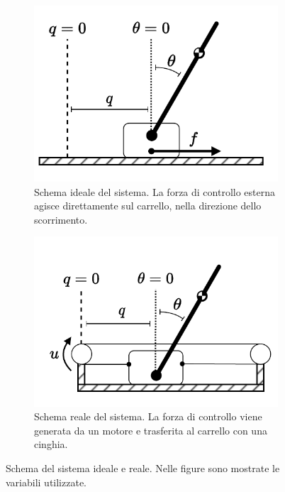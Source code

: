 \begin{figure}[h]
    \centering
    \begin{subfigure}[b]{0.48\textwidth}
        \centering
        \includegraphics[width=\textwidth]{assets/pic}
        \caption{Schema ideale del sistema. La forza di controllo esterna
        agisce direttamente sul carrello, nella direzione dello scorrimento.}
        \label{fig:pic}
    \end{subfigure}
    \hfill
    \begin{subfigure}[b]{0.48\textwidth}
        \centering
        \includegraphics[width=\textwidth]{assets/pic-real}
        \caption{Schema reale del sistema. La forza di controllo viene
        generata da un motore e trasferita al carrello con una cinghia.}
        \label{fig:pic-real}
    \end{subfigure}
    \caption{Schema del sistema ideale e reale. Nelle figure sono mostrate le variabili
    utilizzate.}
\end{figure}



